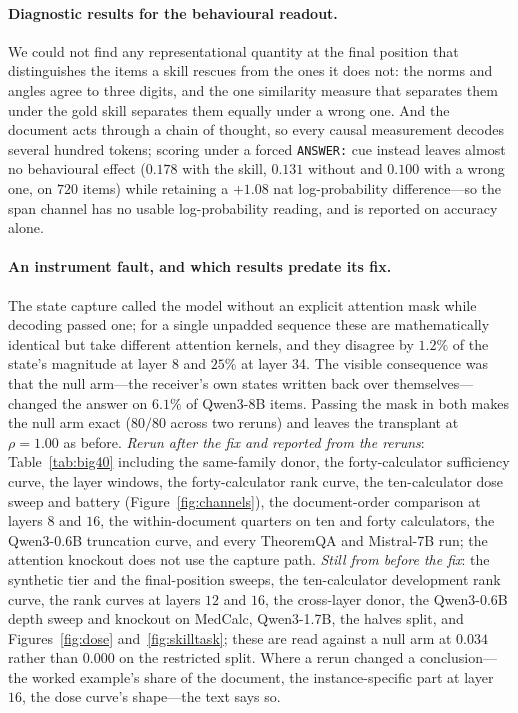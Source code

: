 \documentclass{article}
\begin{document}
\paragraph{Diagnostic results for the behavioural readout.} We could not find any
representational quantity at the final position that distinguishes the items a
skill rescues from the ones it does not: the norms and angles agree to three
digits, and the one similarity measure that separates them under the gold skill
separates them equally under a wrong one. And the document acts through a chain
of thought, so every causal measurement decodes several hundred tokens; scoring
under a forced \texttt{ANSWER:} cue instead leaves almost no behavioural effect
($0.178$ with the skill, $0.131$ without and $0.100$ with a wrong one, on $720$
items) while retaining a $+1.08$ nat log-probability difference---so the span
channel has no usable log-probability reading, and is reported on accuracy
alone.

\paragraph{An instrument fault, and which results predate its fix.} The state
capture called the model without an explicit attention mask while decoding
passed one; for a single unpadded sequence these are mathematically identical
but take different attention kernels, and they disagree by $1.2\%$ of the
state's magnitude at layer 8 and $25\%$ at layer 34. The visible consequence was
that the null arm---the receiver's own states written back over
themselves---changed the answer on $6.1\%$ of Qwen3-8B items. Passing the mask in
both makes the null arm exact ($80/80$ across two reruns) and leaves the transplant at
$\rho = 1.00$ as before. \emph{Rerun after the fix and reported from the
reruns}: Table~\ref{tab:big40} including the same-family donor, the
forty-calculator sufficiency curve, the layer windows, the forty-calculator rank
curve, the ten-calculator dose sweep and battery (Figure~\ref{fig:channels}),
the document-order comparison at layers $8$ and $16$, the within-document
quarters on ten and forty calculators, the Qwen3-0.6B truncation curve, and
every TheoremQA and Mistral-7B run; the attention knockout does not use the
capture path. \emph{Still from before the fix}: the synthetic tier and the
final-position sweeps, the ten-calculator development rank curve, the rank
curves at layers $12$ and $16$, the cross-layer donor, the Qwen3-0.6B depth
sweep and knockout on MedCalc, Qwen3-1.7B, the halves split, and
Figures~\ref{fig:dose} and~\ref{fig:skilltask}; these are read against a null
arm at $0.034$ rather than $0.000$ on the restricted split. Where a rerun
changed a conclusion---the worked example's share of the document, the
instance-specific part at layer $16$, the dose curve's shape---the text says
so.
\end{document}
